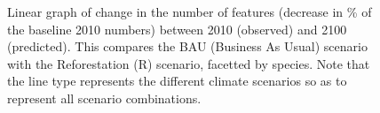 \begin{figure}[h!]
  \caption[Linear graph of change in the number of features (decrease in \% of the baseline 2010 numbers) between 2010 (observed) and 2100 (predicted), comparing BAU scenario with other land use change scenarios]{Linear graph of change in the number of features (decrease in \% of the baseline 2010 numbers) between 2010 (observed) and 2100 (predicted). This compares the BAU (Business As Usual) scenario with the Reforestation (R) scenario, facetted by species. Note that the line type represents the different climate scenarios so as to represent all scenario combinations.}
 \label{fig:surf_linear_1}
\end{figure}


